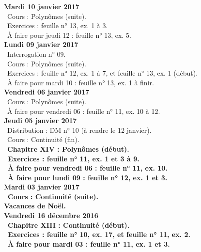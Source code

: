 \documentclass[12pt,a4paper]{article}
\begin{document}
\noindent\textbf{Mardi 10 janvier 2017} \\
\bu\ Cours : Polynômes (suite).\\
\bu\ Exercices : feuille n° 13, ex. 1 à 3.\\
\bu\ À faire pour jeudi 12 : feuille n° 13, ex. 5.\vspace{.4cm}\\
 
\noindent\textbf{ Lundi 09 janvier 2017} \\
\bu\ Interrogation n° 09.\\
\bu\ Cours : Polynômes (suite).\\
\bu\ Exercices : feuille n° 12, ex. 1 à 7, et feuille n° 13, ex. 1 (début).\\
\bu\ À faire pour mardi 10 : feuille n° 13, ex. 1 à finir.\vspace{.4cm}\\

\noindent\textbf{Vendredi 06 janvier 2017}\\
\bu\ Cours : Polynômes (suite).\\
\bu\ À faire pour vendredi 06 : feuille n° 11, ex. 10 à 12.\vspace{.4cm}\\

\noindent\textbf{Jeudi 05 janvier 2017}\\
\bu\ Distribution : DM n° 10 (à rendre le 12 janvier).\\
\bu\ Cours : Continuité (fin).\\
\bu\ \bf Chapitre XIV \rm : Polynômes (début).\\
\bu\ Exercices : feuille n° 11, ex. 1 et 3 à 9.\\
\bu\ À faire pour vendredi 06 : feuille n° 11, ex. 10.\\
\bu\ À faire pour lundi 09 : feuille n° 12, ex. 1 et 3.\vspace{.4cm}\\

\noindent\textbf{Mardi 03 janvier 2017} \\
\bu\ Cours : Continuité (suite).\vspace{.4cm}\\
 
\noindent\textbf{\bf Vacances de Noël}.\vspace{.4cm}\\

\noindent\textbf{Vendredi 16 décembre 2016}\\
\bu\ \bf Chapitre XIII \rm : Continuité (début).\\
\bu\ Exercices : feuille n° 10, ex. 17, et feuille n° 11, ex. 2.\\
\bu\ À faire pour mardi 03 : feuille n° 11, ex. 1 et 3.\vspace{.4cm}\\
\end{document}
